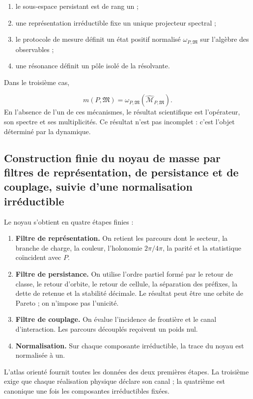 \begin{enumerate}
\item le sous-espace persistant est de rang un ;
\item une représentation irréductible fixe un unique projecteur spectral ;
\item le protocole de mesure définit un état positif normalisé
\(\omega_{P,\mathfrak M}\) sur l'algèbre des observables ;

\item une résonance définit un pôle isolé de la résolvante.
\end{enumerate}
Dans le troisième cas,

\[
 m(P,\mathfrak M)
 =\omega_{P,\mathfrak M}
  (\widehat{\mathcal M}_{P,\mathfrak M}).
\]
En l'absence de l'un de ces mécanismes, le résultat scientifique est l'opérateur, son spectre et ses multiplicités. Ce résultat n'est pas incomplet : c'est l'objet déterminé par la dynamique.

\subsection{Construction finie du noyau de masse par filtres de représentation, de persistance et de couplage, suivie d'une normalisation irréductible}
Le noyau s'obtient en quatre étapes finies :

\begin{enumerate}
\item \textbf{Filtre de représentation.} On retient les parcours dont le secteur, la branche de charge,
la couleur, l'holonomie \(2\pi/4\pi\), la parité et la statistique coïncident avec \(P\).

\item \textbf{Filtre de persistance.} On utilise l'ordre partiel formé par le retour de classe,
le retour d'orbite, le retour de cellule, la séparation des préfixes, la dette de retenue et la stabilité décimale. Le résultat peut être une orbite de Pareto ; on n'impose pas l'unicité.

\item \textbf{Filtre de couplage.} On évalue l'incidence de frontière et le canal
d'interaction. Les parcours découplés reçoivent un poids nul.

\item \textbf{Normalisation.} Sur chaque composante irréductible, la trace du
noyau est normalisée à un.

\end{enumerate}
L'atlas orienté fournit toutes les données des deux premières étapes. La troisième exige que chaque réalisation physique déclare son canal ; la quatrième est canonique une fois les composantes irréductibles fixées.

